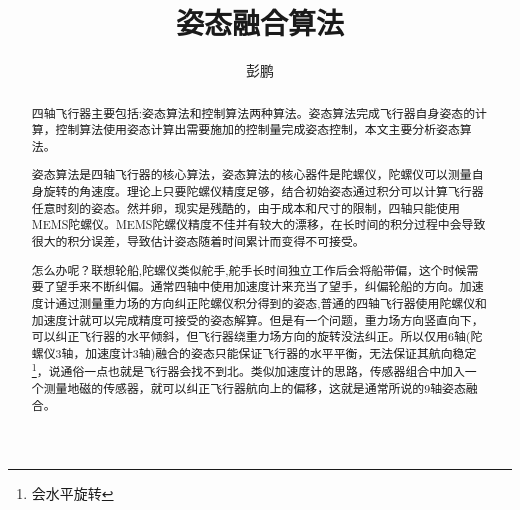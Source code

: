 \documentclass[10pt,a4paper]{article}
\title{姿态融合算法}
\author{彭鹏}
\renewcommand{\citep}[1]{\textsuperscript{\cite{#1}}}
\begin{document}
\maketitle
\newpage
\tableofcontents
\newpage

\begin{abstract}
四轴飞行器主要包括:姿态算法和控制算法两种算法。姿态算法完成飞行器自身姿态的计算，控制算法使用姿态计算出需要施加的控制量完成姿态控制，本文主要分析姿态算法。

姿态算法是四轴飞行器的核心算法，姿态算法的核心器件是陀螺仪，陀螺仪可以测量自身旋转的角速度。理论上只要陀螺仪精度足够，结合初始姿态通过积分可以计算飞行器任意时刻的姿态。然并卵，现实是残酷的，由于成本和尺寸的限制，四轴只能使用MEMS陀螺仪。MEMS陀螺仪精度不佳并有较大的漂移，在长时间的积分过程中会导致很大的积分误差，导致估计姿态随着时间累计而变得不可接受\citep{捷联惯导航}。

怎么办呢？\citep{9轴融合论文}联想轮船,陀螺仪类似舵手,舵手长时间独立工作后会将船带偏，这个时候需要了望手来不断纠偏。通常四轴中使用加速度计来充当了望手，纠偏轮船的方向。加速度计通过测量重力场的方向纠正陀螺仪积分得到的姿态,普通的四轴飞行器使用陀螺仪和加速度计就可以完成精度可接受的姿态解算。但是有一个问题，重力场方向竖直向下，可以纠正飞行器的水平倾斜，但飞行器绕重力场方向的旋转没法纠正。所以仅用6轴(陀螺仪3轴，加速度计3轴)融合的姿态只能保证飞行器的水平平衡，无法保证其航向稳定\footnote{会水平旋转}，说通俗一点也就是飞行器会找不到北。类似加速度计的思路，传感器组合中加入一个测量地磁的传感器\citep{经典博客}，就可以纠正飞行器航向上的偏移，这就是通常所说的9轴姿态融合。
\end{abstract}
\newpage

\end{document}
